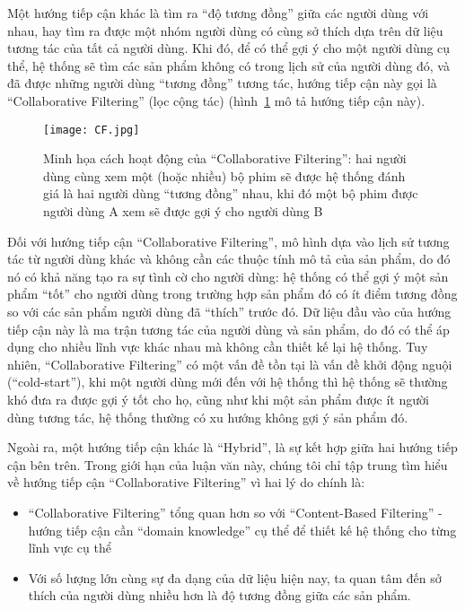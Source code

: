 Một hướng tiếp cận khác là tìm ra ``độ tương đồng'' giữa các người dùng với nhau, hay tìm ra được một nhóm người dùng
có cùng sở thích dựa trên dữ liệu tương tác của tất cả người dùng. Khi đó, để có thể gợi ý cho một người dùng cụ thể,
hệ thống sẽ tìm các sản phẩm không có trong lịch sử của người dùng đó, và đã được những người dùng ``tương đồng'' tương tác,
hướng tiếp cận này gọi là ``Collaborative Filtering'' (lọc cộng tác) (hình~\ref{fig_CF} mô tả hướng tiếp cận này).
\begin{figure}
    \centering
    \texttt{[image: CF.jpg]}
    \caption{Minh họa cách hoạt động của ``Collaborative Filtering'': hai người dùng cùng xem một (hoặc nhiều) bộ phim 
    sẽ được hệ thống đánh giá là hai người dùng ``tương đồng'' nhau, khi đó một bộ phim được
    người dùng A xem sẽ được gợi ý cho người dùng B}
    \label{fig_CF}
\end{figure}
Đối với hướng tiếp cận ``Collaborative Filtering'', mô hình dựa vào lịch sử tương tác từ người dùng khác
và không cần các thuộc tính mô tả của sản phẩm, do đó nó có khả năng tạo ra sự tình cờ cho người dùng:
hệ thống có thể gợi ý một sản phẩm ``tốt'' cho người dùng trong trường hợp sản phẩm đó có ít điểm tương đồng
so với các sản phẩm người dùng đã ``thích'' trước đó. Dữ liệu đầu vào của hướng tiếp cận này là ma trận tương tác
của người dùng và sản phẩm, do đó có thể áp dụng cho nhiều lĩnh vực khác nhau mà không cần thiết kế lại hệ thống.
Tuy nhiên, ``Collaborative Filtering'' có một vấn đề tồn tại là vấn đề khởi động nguội (``cold-start''),
khi một người dùng mới đến với hệ thống thì hệ thống sẽ thường khó đưa ra được gợi ý tốt cho họ,
cũng như khi một sản phẩm được ít người dùng tương tác, hệ thống thường có xu hướng không gợi ý sản phẩm đó.

Ngoài ra, một hướng tiếp cận khác là ``Hybrid'', là sự kết hợp giữa hai hướng tiếp cận bên trên.
Trong giới hạn của luận văn này, chúng tôi chỉ tập trung tìm hiểu về hướng tiếp cận ``Collaborative Filtering''
vì hai lý do chính là:
\begin{itemize}
\item ``Collaborative Filtering'' tổng quan hơn so với ``Content-Based Filtering''
- hướng tiếp cận cần ``domain knowledge'' cụ thể để thiết kế hệ thống cho từng lĩnh vực cụ thể
\item Với số lượng lớn cùng sự đa dạng của dữ liệu hiện nay,
ta quan tâm đến sở thích của người dùng nhiều hơn là độ tương đồng giữa các sản phẩm.

\end{itemize}

